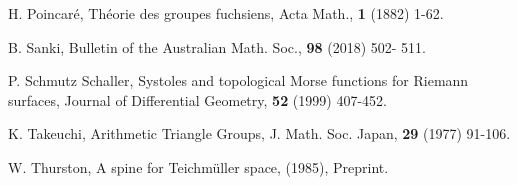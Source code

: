 \documentclass[12pt]{amsart}
\begin{document}
\begin{thebibliography}{}
 H. Poincar\'e, Th\'eorie des groupes fuchsiens, Acta Math., {\bf 1} (1882) 1-62.

 B. Sanki, Bulletin of the Australian Math.  Soc., {\bf 98} (2018) 502- 511.

 P. Schmutz Schaller, Systoles and topological Morse functions for Riemann surfaces, Journal of Differential Geometry,
{\bf 52} (1999) 407-452.


 K. Takeuchi, Arithmetic Triangle Groups,
J. Math. Soc. Japan, {\bf 29} (1977) 91-106.

 W. Thurston, A spine for Teichm\"uller space,
(1985), Preprint.






\end{thebibliography}
\end{document}
